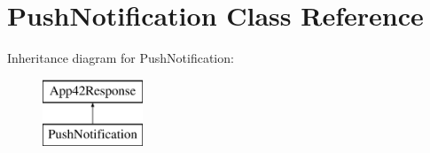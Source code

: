 \hypertarget{class_push_notification}{\section{Push\+Notification Class Reference}
\label{class_push_notification}
}
Inheritance diagram for Push\+Notification\+:\begin{figure}[H]
\begin{center}
\leavevmode
\includegraphics[height=2.000000cm]{class_push_notification}
\end{center}
\end{figure}
